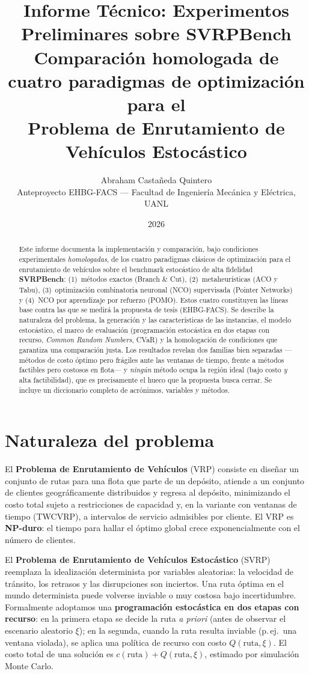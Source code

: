 \documentclass[11pt,a4paper]{article}
\title{\textbf{Informe Técnico: Experimentos Preliminares sobre SVRPBench}\\[2mm]
\large Comparación homologada de cuatro paradigmas de optimización para el\\
Problema de Enrutamiento de Vehículos Estocástico}
\author{Abraham Castañeda Quintero\\
\small Anteproyecto EHBG-FACS --- Facultad de Ingeniería Mecánica y Eléctrica, UANL}
\date{2026}
\begin{document}
\maketitle

\begin{abstract}
\noindent Este informe documenta la implementación y comparación, bajo condiciones
experimentales \emph{homologadas}, de los cuatro paradigmas clásicos de optimización para
el enrutamiento de vehículos sobre el benchmark estocástico de alta fidelidad
\textbf{SVRPBench}: (1)~métodos exactos (Branch \& Cut), (2)~metaheurísticas (ACO y Tabu),
(3)~optimización combinatoria neuronal (NCO) supervisada (Pointer Networks) y (4)~NCO por
aprendizaje por refuerzo (POMO). Estos cuatro constituyen las líneas base contra las que se
medirá la propuesta de tesis (EHBG-FACS). Se describe la naturaleza del problema, la
generación y las características de las instancias, el modelo estocástico, el marco de
evaluación (programación estocástica en dos etapas con recurso, \emph{Common Random
Numbers}, CVaR) y la homologación de condiciones que garantiza una comparación justa. Los
resultados revelan dos familias bien separadas —métodos de costo óptimo pero frágiles ante
las ventanas de tiempo, frente a métodos factibles pero costosos en flota— y \emph{ningún}
método ocupa la región ideal (bajo costo \emph{y} alta factibilidad), que es precisamente el
hueco que la propuesta busca cerrar. Se incluye un diccionario completo de acrónimos,
variables y métodos.
\end{abstract}

\tableofcontents

\section{Naturaleza del problema}
\label{sec:problema}

El \textbf{Problema de Enrutamiento de Vehículos} (VRP) consiste en diseñar un conjunto de
rutas para una flota que parte de un depósito, atiende a un conjunto de clientes
geográficamente distribuidos y regresa al depósito, minimizando el costo total sujeto a
restricciones de capacidad y, en la variante con ventanas de tiempo (TWCVRP), a intervalos
de servicio admisibles por cliente. El VRP es \textbf{NP-duro}: el tiempo para hallar el
óptimo global crece exponencialmente con el número de clientes.

El \textbf{Problema de Enrutamiento de Vehículos Estocástico} (SVRP) reemplaza la idealización
determinista por variables aleatorias: la velocidad de tránsito, los retrasos y las
disrupciones son inciertos. Una ruta óptima en el mundo determinista puede volverse inviable
o muy costosa bajo incertidumbre. Formalmente adoptamos una \textbf{programación estocástica
en dos etapas con recurso}: en la primera etapa se decide la ruta \emph{a priori} (antes de
observar el escenario aleatorio $\xi$); en la segunda, cuando la ruta resulta inviable (p.\,ej.\
una ventana violada), se aplica una política de recurso con costo $Q(\text{ruta},\xi)$. El
costo total de una solución es $c(\text{ruta}) + Q(\text{ruta},\xi)$, estimado por simulación
Monte Carlo.
\end{document}
